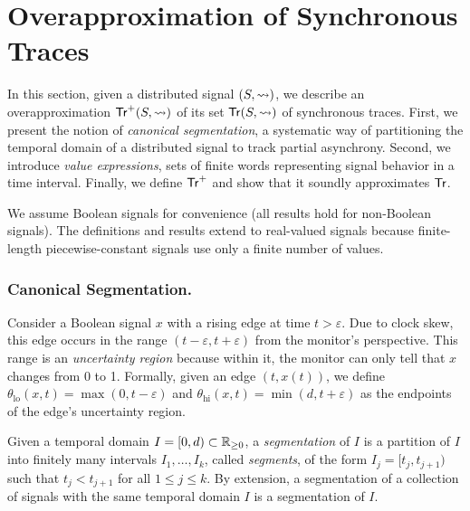 \section{Overapproximation of Synchronous Traces} 
\label{sec:approach}

In this section, given a distributed signal $(S,{\rightsquigarrow})$, we describe an overapproximation $\mathsf{Tr}^+(S,{\rightsquigarrow})$ of its set $\mathsf{Tr}(S,{\rightsquigarrow})$ of synchronous traces.
First, we present the notion of \emph{canonical segmentation}, a systematic way of partitioning the temporal domain of a distributed signal to track partial asynchrony.
Second, we introduce \emph{value expressions}, sets of finite words representing signal behavior in a time interval.
Finally, we define $\mathsf{Tr}^+$ and show that it soundly approximates $\mathsf{Tr}$.

\begin{remark}
	We assume Boolean signals for convenience (all results hold for non-Boolean signals).
	The definitions and results extend to real-valued signals because finite-length piecewise-constant signals use only a finite number of values.
\end{remark}

\subsubsection{Canonical Segmentation.}
Consider a Boolean signal $x$ with a rising edge at time $t > \varepsilon$.
Due to clock skew, this edge occurs in the range $(t - \varepsilon, t + \varepsilon)$ from the monitor's perspective.
This range is an \emph{uncertainty region} because within it, the monitor can only tell that $x$ changes from 0 to 1. Formally, given an edge $(t, x(t))$, we define $\theta_{\text{lo}}(x,t) = \max(0, t - \varepsilon)$ and $\theta_{\text{hi}}(x,t) = \min(d, t + \varepsilon)$ as the endpoints of the edge's uncertainty region.

Given a temporal domain $I = [0,d) \subset \mathbb{R}_{\geq 0}$, a \emph{segmentation} of $I$ is a partition of $I$ into finitely many intervals $I_1, \ldots, I_k$, called \emph{segments}, of the form $I_j = [t_j, t_{j+1})$ such that $t_j < t_{j+1}$ for all $1 \leq j \leq k$.
By extension, a segmentation of a collection of signals with the same temporal domain $I$ is a segmentation of $I$.

